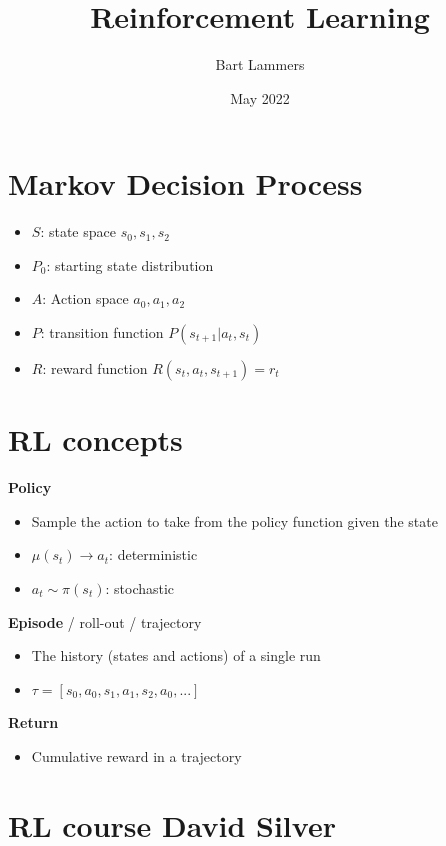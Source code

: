 \documentclass{article}
\title{Reinforcement Learning}
\author{Bart Lammers}
\date{May 2022}
\begin{document}
\maketitle

\tableofcontents
\clearpage

\section{Markov Decision Process}

\begin{itemize}
    \item $S$: state space $s_0, s_1, s_2$
    \item $P_0$: starting state distribution
    \item $A$: Action space $a_0, a_1, a_2$
    \item $P$: transition function $P(s_{t+1}|a_t, s_t)$
    \item $R$: reward function $R(s_t, a_t, s_{t+1})=r_t$
\end{itemize}

\section{RL concepts}

\textbf{Policy}

\begin{itemize}
    \item Sample the action to take from the policy function given the state
    \item $\mu(s_t) \rightarrow a_t$: deterministic
    \item $a_t \sim \pi(s_t)$: stochastic
\end{itemize}

\textbf{Episode} / roll-out / trajectory

\begin{itemize}
    \item The history (states and actions) of a single run
    \item $\tau = [s_0, a_0, s_1, a_1, s_2, a_0, ...]$
\end{itemize}

\textbf{Return}

\begin{itemize}
    \item Cumulative reward in a trajectory
\end{itemize}

\section{RL course David Silver}
\end{document}
